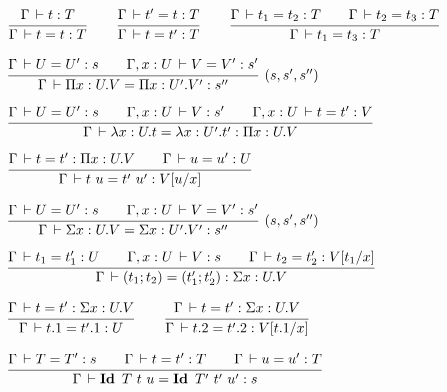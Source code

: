 \documentclass[a4paper,english]{lipics-utf8x}
\begin{document}

  \begin{center}
  \(
    \ru{\Gamma \der t : T
      }{\Gamma \der t = t : T}
    \qquad
    \ru{\Gamma \der t' = t : T
      }{\Gamma \der t = t' : T}
    \qquad
    \ru{\Gamma \der t_1 = t_2 : T \qquad
        \Gamma \der t_2 = t_3 : T
      }{\Gamma \der t_1 = t_3 : T}
  \)
  \end{center}


  \begin{center}
  \(
    \rux{\Gamma \der U = U' : s \qquad
         \Gamma, x:U \der V = V' : s'
       }{\Gamma \der \Pi x:U.V = \Pi x:U'.V' : s''
       }{(s,s',s'')}
  \)
  \end{center}

  \begin{center}
  \(
    \ru{\Gamma \der U = U' : s \qquad
        \Gamma, x:U \der V : s' \qquad
        \Gamma, x:U \der t = t' : V
      }{\Gamma \der \lambda x:U.t = \lambda x:U'.t' : \Pi x:U.V}
  \)
  \end{center}

  \begin{center}
  \(
    \ru{\Gamma \der t = t' : \Pi x:U.V \qquad
        \Gamma \der u = u' : U
      }{\Gamma \der t~u = t'~u' : V[u/x]}
  \)
  \end{center}

  \begin{center}
  \(
    \rux{\Gamma \der U = U' : s \qquad
         \Gamma, x:U \der V = V' : s'
       }{\Gamma \der \Sigma x:U.V = \Sigma x:U'.V' : s''
       }{(s,s',s'')}
  \)
  \end{center}

  \begin{center}
  \(
    \ru{\Gamma \der t_1 = t'_1 : U \qquad
        \Gamma, x:U \der V : s \qquad
        \Gamma \der t_2 = t'_2 : V[t_1/x]
      }{\Gamma \der (t_1;t_2) = (t'_1;t'_2) : \Sigma x:U.V}
  \)
  \end{center}

  \begin{center}
  \(
    \ru{\Gamma \der t = t' : \Sigma x:U.V
      }{\Gamma \der t.1 = t'.1 : U}
    \qquad
    \ru{\Gamma \der t = t' : \Sigma x:U.V
      }{\Gamma \der t.2 = t'.2 : V[t.1/x]}
  \)
  \end{center}

  \begin{center}
  \(
    \ru{\Gamma \der T = T' : s \qquad
        \Gamma \der t = t' : T \qquad
        \Gamma \der u = u' : T
      }{\Gamma \der \Id T\ t\ u = \Id T'\ t'\ u' : s}
  \)
  \end{center}
\end{document}
